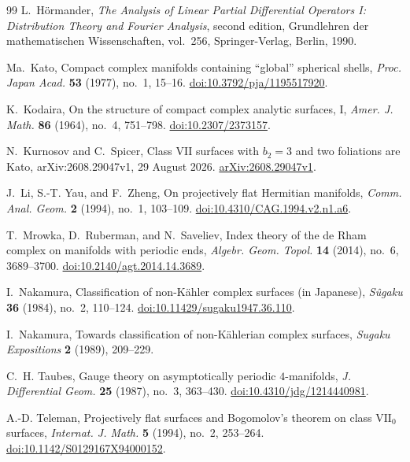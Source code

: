 \begin{thebibliography}{99}
L.~H\"ormander,
\emph{The Analysis of Linear Partial Differential Operators I:
Distribution Theory and Fourier Analysis}, second edition,
Grundlehren der mathematischen Wissenschaften, vol.~256,
Springer-Verlag, Berlin, 1990.

Ma.~Kato, Compact complex manifolds containing ``global'' spherical shells,
\emph{Proc. Japan Acad.} \textbf{53} (1977), no.~1, 15--16.
\href{https://doi.org/10.3792/pja/1195517920}{doi:10.3792/pja/1195517920}.

K.~Kodaira, On the structure of compact complex analytic surfaces, I,
\emph{Amer. J. Math.} \textbf{86} (1964), no.~4, 751--798.
\href{https://doi.org/10.2307/2373157}{doi:10.2307/2373157}.

N.~Kurnosov and C.~Spicer, Class VII surfaces with $b_2=3$ and two
foliations are Kato, arXiv:2608.29047v1, 29 August 2026.
\href{https://arxiv.org/abs/2608.29047v1}{arXiv:2608.29047v1}.

J.~Li, S.-T. Yau, and F.~Zheng, On projectively flat Hermitian manifolds,
\emph{Comm. Anal. Geom.} \textbf{2} (1994), no.~1, 103--109.
\href{https://doi.org/10.4310/CAG.1994.v2.n1.a6}{doi:10.4310/CAG.1994.v2.n1.a6}.

T.~Mrowka, D.~Ruberman, and N.~Saveliev,
Index theory of the de Rham complex on manifolds with periodic ends,
\emph{Algebr. Geom. Topol.} \textbf{14} (2014), no.~6, 3689--3700.
\href{https://doi.org/10.2140/agt.2014.14.3689}{doi:10.2140/agt.2014.14.3689}.

I.~Nakamura, Classification of non-K\"ahler complex surfaces (in Japanese),
\emph{S\^ugaku} \textbf{36} (1984), no.~2, 110--124.
\href{https://doi.org/10.11429/sugaku1947.36.110}{doi:10.11429/sugaku1947.36.110}.

I.~Nakamura, Towards classification of non-K\"ahlerian complex surfaces,
\emph{Sugaku Expositions} \textbf{2} (1989), 209--229.

C.~H. Taubes, Gauge theory on asymptotically periodic $4$-manifolds,
\emph{J. Differential Geom.} \textbf{25} (1987), no.~3, 363--430.
\href{https://doi.org/10.4310/jdg/1214440981}{doi:10.4310/jdg/1214440981}.

A.-D. Teleman, Projectively flat surfaces and Bogomolov's theorem on
class $\mathrm{VII}_0$ surfaces,
\emph{Internat. J. Math.} \textbf{5} (1994), no.~2, 253--264.
\href{https://doi.org/10.1142/S0129167X94000152}{doi:10.1142/S0129167X94000152}.


\end{thebibliography}
